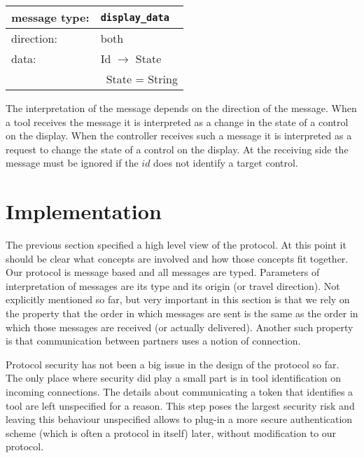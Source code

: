 \documentclass{article}
\newcommand{\msg}[1]{\texttt{#1}}
\begin{document}
   \begin{table}[H]
    \begin{center}
     \begin{tabular}{|ll|}
      \hline
       message type:   & \msg{display\_data} \\
      \hline
       direction:      & both \\
       data:           & Id $\rightarrow$ State \\
                       & \ State = String \\
      \hline
     \end{tabular}
    \end{center}
   \vspace{-0.4cm}
   \end{table}

   \noindent The interpretation of the message depends on the direction of the
   message. When a tool receives the message it is interpreted as a change in
   the state of a control on the display. When the controller receives such a
   message it is interpreted as a request to change the state of a control on
   the display. At the receiving side the message must be ignored if the $id$
   does not identify a target control.

\pagebreak
 \section{Implementation} \label{s:protocol_implementation}

   The previous section specified a high level view of the protocol. At this
   point it should be clear what concepts are involved and how those concepts
   fit together. Our protocol is message based and all messages are typed.
   Parameters of interpretation of messages are its type and its origin (or
   travel direction). Not explicitly mentioned so far, but very important in
   this section is that we rely on the property that the order in which
   messages are sent is the same as the order in which those messages are
   received (or actually delivered). Another such property is that
   communication between partners uses a notion of connection.
   
   Protocol security has not been a big issue in the design of the protocol so
   far. The only place where security did play a small part is in tool
   identification on incoming connections. The details about communicating a
   token that identifies a tool are left unspecified for a reason. This step
   poses the largest security risk and leaving this behaviour unspecified
   allows to plug-in a more secure authentication scheme (which is often a
   protocol in itself) later, without modification to our protocol.
\end{document}
